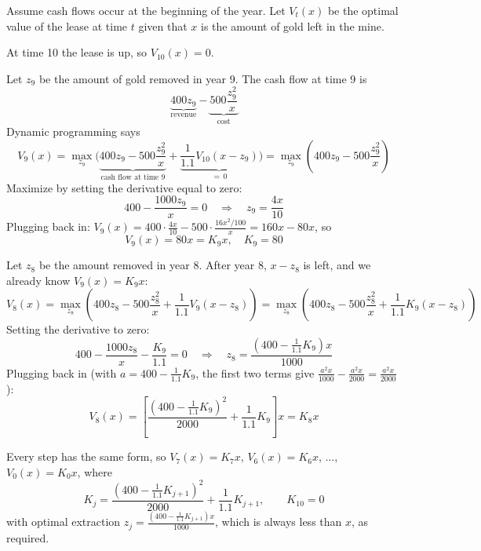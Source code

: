 Assume cash flows occur at the beginning of the year. Let $V_t(x)$ be the optimal value of the lease at time $t$ given that $x$ is the amount of gold left in the mine.

At time 10 the lease is up, so $V_{10}(x) = 0$.

Let $z_9$ be the amount of gold removed in year 9. The cash flow at time 9 is
\[\underbrace{400z_9}_{\text{revenue}} - \underbrace{500\frac{z_9^2}{x}}_{\text{cost}}\]
Dynamic programming says
\[V_9(x) = \max_{z_9}\Bigg(\underbrace{400z_9 - 500\frac{z_9^2}{x}}_{\text{cash flow at time 9}} + \underbrace{\frac{1}{1.1}V_{10}(x - z_9)}_{=\,0}\Bigg) = \max_{z_9}\left(400z_9 - 500\frac{z_9^2}{x}\right)\]
Maximize by setting the derivative equal to zero:
\[400 - \frac{1000z_9}{x} = 0 \quad \Rightarrow \quad z_9 = \frac{4x}{10}\]
Plugging back in: $V_9(x) = 400\cdot\frac{4x}{10} - 500\cdot\frac{16x^2/100}{x} = 160x - 80x$, so
\[\boxed{V_9(x) = 80x = K_9x, \quad K_9 = 80}\]

Let $z_8$ be the amount removed in year 8. After year 8, $x - z_8$ is left, and we already know $V_9(x) = K_9x$:
\[V_8(x) = \max_{z_8}\left(400z_8 - 500\frac{z_8^2}{x} + \frac{1}{1.1}V_9(x - z_8)\right) = \max_{z_8}\left(400z_8 - 500\frac{z_8^2}{x} + \frac{1}{1.1}K_9(x - z_8)\right)\]
Setting the derivative to zero:
\[400 - \frac{1000z_8}{x} - \frac{K_9}{1.1} = 0 \quad \Rightarrow \quad z_8 = \frac{\left(400 - \frac{1}{1.1}K_9\right)x}{1000}\]
Plugging back in (with $a = 400 - \frac{1}{1.1}K_9$, the first two terms give $\frac{a^2x}{1000} - \frac{a^2x}{2000} = \frac{a^2x}{2000}$):
\[\boxed{V_8(x) = \left[\frac{\left(400 - \frac{1}{1.1}K_9\right)^2}{2000} + \frac{1}{1.1}K_9\right]x = K_8x}\]

Every step has the same form, so $V_7(x) = K_7x$, $V_6(x) = K_6x$, $\dots$, $V_0(x) = K_0x$, where
\[\boxed{K_j = \frac{\left(400 - \frac{1}{1.1}K_{j+1}\right)^2}{2000} + \frac{1}{1.1}K_{j+1}, \qquad K_{10} = 0}\]
with optimal extraction $z_j = \frac{\left(400 - \frac{1}{1.1}K_{j+1}\right)x}{1000}$, which is always less than $x$, as required.

